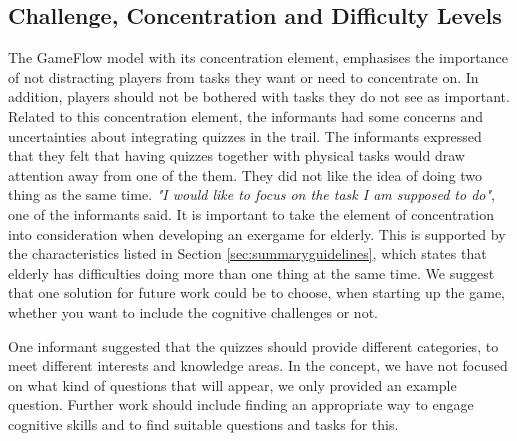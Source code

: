 \subsection{Challenge, Concentration and Difficulty Levels}

The GameFlow model with its concentration element, emphasises the importance of not distracting players from tasks they want or need to concentrate on. In addition, players should not be bothered with tasks they do not see as important. Related to this concentration element, the informants had some concerns and uncertainties about integrating quizzes in the trail. The informants expressed that they felt that having quizzes together with physical tasks would draw attention away from one of the them. They did not like the idea of doing two thing as the same time. \emph{"I would like to focus on the task I am supposed to do"}, one of the informants said. It is important to take the element of concentration into consideration when developing an exergame for elderly. This is supported by the characteristics listed in Section \ref{sec:summaryguidelines}, which states that elderly has difficulties doing more than one thing at the same time. We suggest that one solution for future work could be to choose, when starting up the game, whether you want to include the cognitive challenges or not. 

One informant suggested that the quizzes should provide different categories, to meet different interests and knowledge areas. In the concept, we have not focused on what kind of questions that will appear, we only provided an example question. Further work should include finding an appropriate way to engage cognitive skills and to find suitable questions and tasks for this.

